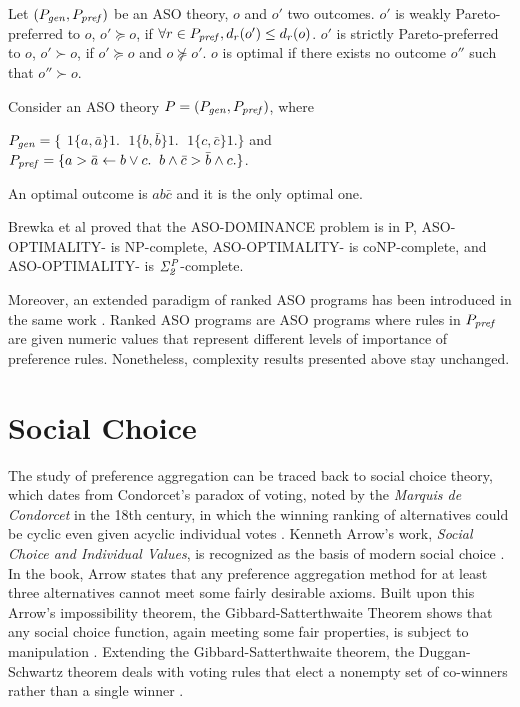 \begin{definition}
	Let $(P_{\mathit{gen}}, P_{\mathit{pref}})$ be an ASO theory,
	$o$ and $o'$ two outcomes.
	$o'$ is weakly Pareto-preferred to $o$, $o' \succeq o$,
	if $\forall r \in P_{\mathit{pref}}, d_r(o') \leq d_r(o)$.
	$o'$ is strictly Pareto-preferred to $o$, $o' \succ o$,
	if $o' \succeq o$ and $o \not \succeq o'$.
	$o$ is optimal if there exists no outcome $o''$ such that
	$o'' \succ o$.
\end{definition}

Consider an ASO theory $P=(P_{\mathit{gen}}, P_{\mathit{pref}})$, where
\begin{center}
	$P_{\mathit{gen}}=\{$
	$1\{a,\bar{a}\}1. \;$
	$1\{b,\bar{b}\}1. \;$
	$1\{c,\bar{c}\}1.\}$ and\\
	$P_{\mathit{pref}}=\{
		a > \bar{a} \leftarrow b \vee c. \;\;
		b \wedge \bar{c} > \bar{b} \wedge c.
	\}$.
\end{center}
An optimal outcome is $ab\bar{c}$ and it is the only optimal one.

Brewka et al \cite{Brewka03answerset} proved that
the ASO-DOMINANCE problem is in P, ASO-OPTIMALITY-
is NP-complete, ASO-OPTIMALITY- is coNP-complete,
and ASO-OPTIMALITY- is $\mathit{\Sigma^P_2}$-complete.

Moreover, an extended paradigm of ranked ASO programs has
been introduced in the same work \cite{Brewka03answerset}.
Ranked ASO programs are ASO programs where rules in $P_{\mathit{pref}}$
are given numeric values that represent different levels of importance
of preference rules.  Nonetheless, complexity results presented
above stay unchanged.




\section{Social Choice}
The study of preference aggregation can be traced back to social choice theory,
which dates from Condorcet's paradox of voting, noted by the
\textit{Marquis de Condorcet} in the 18th century, in which
the winning ranking of alternatives could be cyclic even 
given acyclic individual votes \cite{wiki:soc}.
Kenneth Arrow's work, \textit{Social Choice and Individual Values},
is recognized as the basis of modern social choice \cite{aarrow:b:socialchoice}.
In the book, Arrow states that any preference aggregation method for at least three
alternatives cannot meet some fairly desirable axioms.
Built upon this Arrow's impossibility theorem, the Gibbard-Satterthwaite Theorem shows
that any social choice function, again meeting some fair properties, is subject
to manipulation \cite{gib:j:maip-scheme,satt:j:strat-proof}.
Extending the Gibbard-Satterthwaite theorem, the Duggan-Schwartz theorem deals with 
voting rules that elect a nonempty set of co-winners rather than a single winner
\cite{dug-sch:j:maipres}.

